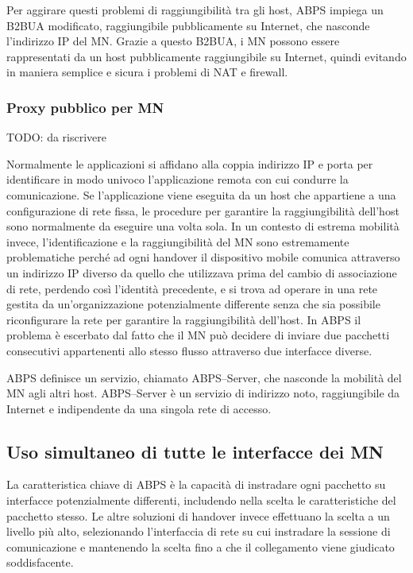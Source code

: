 \documentclass[12pt,a4paper,openright,twoside]{book}
\begin{document}
Per aggirare questi problemi di raggiungibilità tra gli host, ABPS
impiega un B2BUA modificato, raggiungibile pubblicamente su Internet,
che nasconde l'indirizzo IP del MN. Grazie a questo B2BUA, i MN
possono essere rappresentati da un host pubblicamente raggiungibile su
Internet, quindi evitando in maniera semplice e sicura i problemi di
NAT e firewall.

\subsubsection{Proxy pubblico per MN}
TODO: da riscrivere

Normalmente le applicazioni si affidano alla coppia indirizzo IP e
porta per identificare in modo univoco l'applicazione remota con cui
condurre la comunicazione. Se l'applicazione viene eseguita da un host
che appartiene a una configurazione di rete fissa, le procedure per
garantire la raggiungibilità dell'host sono normalmente da eseguire
una volta sola. In un contesto di estrema mobilità invece,
l'identificazione e la raggiungibilità del MN sono estremamente
problematiche perché ad ogni handover il dispositivo mobile comunica
attraverso un indirizzo IP diverso da quello che utilizzava prima del
cambio di associazione di rete, perdendo così l'identità precedente, e
si trova ad operare in una rete gestita da un'organizzazione
potenzialmente differente senza che sia possibile riconfigurare la
rete per garantire la raggiungibilità dell'host. In ABPS il problema è
escerbato dal fatto che il MN può decidere di inviare due pacchetti
consecutivi appartenenti allo stesso flusso attraverso due interfacce
diverse.

ABPS definisce un servizio, chiamato ABPS--Server, che nasconde la
mobilità del MN agli altri host. ABPS--Server è un servizio di
indirizzo noto, raggiungibile da Internet e indipendente da una
singola rete di accesso.

\subsection{Uso simultaneo di tutte le interfacce dei MN}
La caratteristica chiave di ABPS è la capacità di instradare ogni
pacchetto su interfacce potenzialmente differenti, includendo nella
scelta le caratteristiche del pacchetto stesso. Le altre soluzioni di
handover invece effettuano la scelta a un livello più alto,
selezionando l'interfaccia di rete su cui instradare la sessione di
comunicazione e mantenendo la scelta fino a che il collegamento viene
giudicato soddisfacente.
\end{document}
